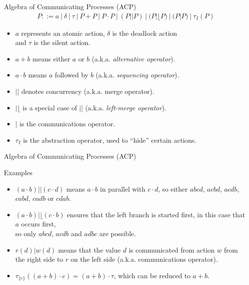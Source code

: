 \documentclass[aspectratio=1610]{beamer}
\begin{document}
  \begin{frame}{Algebra of Communicating Processes (ACP)}
    \begin{align*}
      P ::= a\ |\ \delta\ |\ \tau\ |\ P + P\ |\ P \cdot P\ |\ (P || P)\ |\ (P |\lfloor P)\ |\ (P | P)\ |\ \tau_I(P)
    \end{align*}

    \begin{itemize}
      \item $a$ represents an atomic action, $\delta$ is the deadlock action \\ and $\tau$ is the silent action.
      \item $a + b$ means either $a$ or $b$ (a.k.a. \textit{alternative operator}).
      \item $a \cdot b$ means $a$ followed by $b$ (a.k.a. \textit{sequencing operator}).
      \item $||$ denotes concurrency (a.k.a. merge operator).
      \item $|\lfloor$ is a special case of $||$ (a.k.a. \textit{left-merge operator}).
      \item $|$ is the communications operator.
      \item $\tau_I$ is the abstraction operator, used to “hide” certain actions.
    \end{itemize}
  \end{frame}

  \begin{frame}{Algebra of Communicating Processes (ACP)}
    \begin{exampleblock}{Examples}
      \begin{itemize}
        \item $(a \cdot b) || (c \cdot d)$ means $a \cdot b$ in parallel with $c \cdot d$, so either $abcd$, $acbd$, $acdb$, $cabd$, $cadb$ or $cdab$.
        \item $(a \cdot b) |\lfloor (c \cdot b)$ ensures that the left branch is started first, in this case that $a$ occurs first, \\ so only $abcd$, $acdb$ and $adbc$ are possible.
        \item $r(d) | w(d)$ means that the value $d$ is communicated from action $w$ from the right side to $r$ on the left side (a.k.a. communications operator).
        \item $\tau_{\{c\}}((a+b)\cdot c) = (a + b) \cdot \tau$, which can be reduced to $a + b$.
      \end{itemize}
    \end{exampleblock}
  \end{frame}
\end{document}
